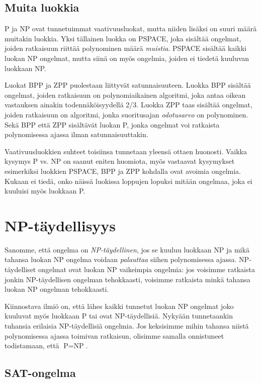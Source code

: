 \subsection{Muita luokkia}

P ja NP ovat tunnetuimmat vaativuusluokat,
mutta niiden lisäksi on suuri määrä muitakin luokkia.
Yksi tällainen luokka on PSPACE,
joka sisältää ongelmat, joiden ratkaisuun riittää
polynominen määrä \emph{muistia}.
PSPACE sisältää kaikki luokan NP ongelmat,
mutta siinä on myös ongelmia,
joiden ei tiedetä kuuluvan luokkaan NP.

Luokat BPP ja ZPP puolestaan liittyvät satunnaisuuteen.
Luokka BPP sisältää ongelmat, joiden ratkaisuun on polynomiaikainen algoritmi,
joka antaa oikean vastauksen ainakin todennäköisyydellä 2/3.
Luokka ZPP taas sisältää ongelmat, joiden ratkaisuun on algoritmi,
jonka suoritusajan \emph{odotusarvo} on polynominen.
Sekä BPP että ZPP sisältävät luokan P, jonka ongelmat
voi ratkaista polynomisessa ajassa ilman satunnaisuuttakin.

Vaativuusluokkien suhteet toisiinsa tunnetaan yleensä ottaen huonosti.
Vaikka kysymys P vs. NP on saanut eniten huomiota,
myös vastaavat kysymykset esimerkiksi luokkien PSPACE, BPP ja ZPP
kohdalla ovat avoimia ongelmia.
Kukaan ei tiedä, onko näissä luokissa loppujen lopuksi mitään ongelmaa,
joka ei kuuluisi myös luokkaan P.

\section{NP-täydellisyys}

Sanomme, että ongelma on \emph{NP-täydellinen},
jos se kuuluu luokkaan NP ja mikä tahansa luokan NP
ongelma voidaan \emph{palauttaa} siihen polynomisessa ajassa.
NP-täydelliset ongelmat ovat luokan NP vaikeimpia ongelmia:
jos voisimme ratkaista jonkin NP-täydellisen ongelman tehokkaasti,
voisimme ratkaista minkä tahansa luokan NP ongelman tehokkaasti.

Kiinnostava ilmiö on, että lähes kaikki tunnetut luokan NP
ongelmat joko kuuluvat myös luokkaan P tai ovat NP-täydellisiä.
Nykyään tunnetaankin tuhansia erilaisia NP-täydellisiä ongelmia.
Jos keksisimme mihin tahansa niistä polynomisessa ajassa toimivan
ratkaisun, olisimme samalla onnistuneet todistamaan,
että $\textrm{P}=\textrm{NP}$.

\subsection{SAT-ongelma}

